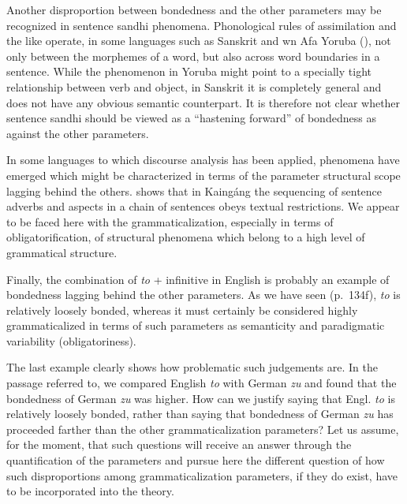 Another disproportion between bondedness and the other parameters may be recognized in sentence sandhi phenomena. Phonological rules of assimilation and the like operate, in some languages such as Sanskrit and wn Afa Yoruba (\citet[26f]{HeineEtAl1984}), not only between the morphemes of a word, but also across word boundaries in a sentence. While the phenomenon in Yoruba might point to a specially tight relationship between verb and object, in Sanskrit it is completely general and does not have any obvious semantic counterpart. It is therefore not clear whether sentence sandhi should be viewed as a “hastening forward” of bondedness as against the other parameters.

In some languages to which discourse analysis has been applied, phenomena have emerged which might be characterized in terms of the parameter structural scope lagging behind the others. \citet{Wiesemann1980} shows that in Kaingáng the sequencing of sentence adverbs and aspects in a chain of sentences obeys textual restrictions. We appear to be faced here with the grammaticalization, especially in terms of obligatorification, of structural phenomena which belong to a high level of grammatical structure.

Finally, the combination of \textit{to} + infinitive in English is probably an example of bondedness lagging behind the other parameters. As we have seen (p.~134f), \textit{to} is relatively loosely bonded, whereas it must certainly be considered highly grammaticalized in terms of such parameters as semanticity and paradigmatic variability (obligatoriness).

The last example clearly shows how problematic such judgements are. In the passage referred to, we compared English \textit{to} with German \textit{zu} and found that the bondedness of German \textit{zu} was higher. How can we justify saying that Engl. \textit{to} is relatively loosely bonded, rather than saying that bondedness of German \textit{zu} has proceeded farther than the other grammaticalization parameters? Let us assume, for the moment, that such questions will receive an answer through the quantification of the parameters and pursue here the different question of how such disproportions among grammaticalization parameters, if they do exist, have to be incorporated into the theory.

